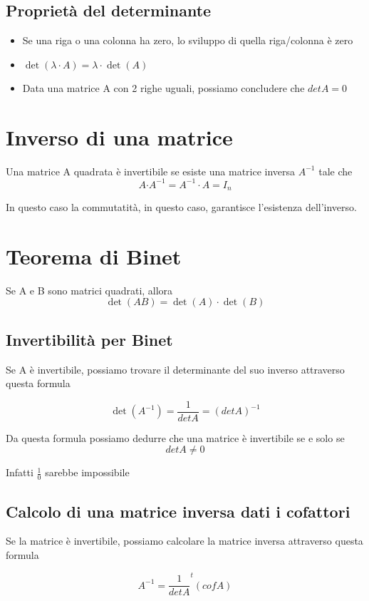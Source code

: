 \documentclass[a4paper, 10pt]{article}
\begin{document}
\subsection{Proprietà del determinante}

\begin{itemize}
	\item Se una riga o una colonna ha zero, lo sviluppo di quella riga/colonna è zero
	\item $ \det{\left(\lambda \cdot A\right)}=\lambda\cdot\det{\left(A\right)} $
	\item Data una matrice A con 2 righe uguali, possiamo concludere che $ detA = 0 $
\end{itemize}


\section{Inverso di una matrice}

Una matrice A quadrata è invertibile se esiste una matrice inversa $ A^{-1} $ tale che $$A{\cdot A}^{-1}=A^{-1}\cdot A=I_n$$

In questo caso la commutatità, in questo caso, garantisce l'esistenza dell'inverso.

\section{Teorema di Binet}

Se A e B sono matrici quadrati, allora $$\det{\left(AB\right)}=\det{\left(A\right)}\cdot\det{\left(B\right)}$$

\subsection{Invertibilità per Binet}

Se A è invertibile, possiamo trovare il determinante del suo inverso attraverso questa formula

$$\det{\left(A^{-1}\right)}=\frac{1}{detA}=\left(detA\right)^{-1}$$

Da questa formula possiamo dedurre che una matrice è invertibile se e solo se $$ detA \neq 0 $$

Infatti $\frac{1}{0}$ sarebbe impossibile

\subsection{Calcolo di una matrice inversa dati i cofattori}

Se la matrice è invertibile, possiamo calcolare la matrice inversa attraverso questa formula

$$A^{-1}=\frac{1}{detA}^t\left(cofA\right)$$
\end{document}
